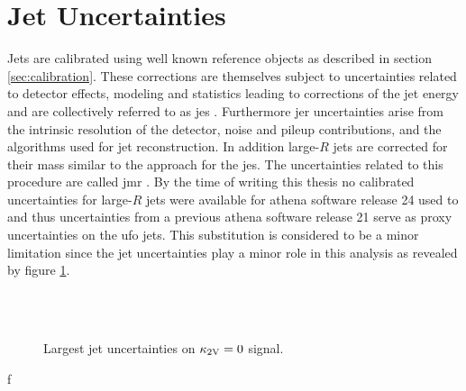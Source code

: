 \section{Jet Uncertainties}
Jets are calibrated using well known reference objects as described in section \ref{sec:calibration}. These corrections are themselves subject to uncertainties related to detector effects, modeling and statistics leading to corrections of the jet energy and are collectively referred to as \ac{jes} \citep{atlas2021jet,Aaboud:2019aa}. %
Furthermore \ac{jer} uncertainties arise from the intrinsic resolution of the detector, noise and pileup contributions, and the algorithms used for jet reconstruction. In addition large-$R$ jets are corrected for their mass similar to the approach for the \ac{jes}. The uncertainties related to this procedure are called \ac{jmr} \citep{ATLAS-CONF-2020-022}. By the time of writing this thesis no calibrated uncertainties for large-$R$ jets were available for athena software release 24 used to  and thus uncertainties from a previous athena software release 21 \citep{Athena} serve as proxy uncertainties on the \ac{ufo} jets. This substitution is considered to be a minor limitation since the jet uncertainties play a minor role in this analysis as revealed by figure \ref{fig:jet_uncertainties}.
\begin{figure}
    \centering
    \\
    \\
    \caption[]{Largest jet uncertainties on $\kappa_{\text{2V}}=0$ signal.}
    \label{fig:jet_uncertainties}
\end{figure}

f

